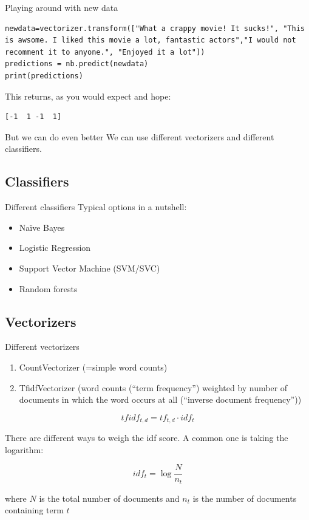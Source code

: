 \documentclass[compress]{beamer}
\begin{document}
\begin{frame}[fragile]{Playing around with new data}
\begin{lstlisting}
newdata=vectorizer.transform(["What a crappy movie! It sucks!", "This is awsome. I liked this movie a lot, fantastic actors","I would not recomment it to anyone.", "Enjoyed it a lot"])
predictions = nb.predict(newdata)
print(predictions)
\end{lstlisting}
This returns, as you would expect and hope:
\begin{lstlisting} 
[-1  1 -1  1]
\end{lstlisting}


\end{frame}




\begin{frame}{But we can do even better}
	We can use different vectorizers and different classifiers.
\end{frame}


\subsection{Classifiers}


\begin{frame}{Different classifiers}
	Typical options in a nutshell:
	\begin{itemize}
		\item Na\"ive Bayes
		\item Logistic Regression
		\item Support Vector Machine (SVM/SVC)
		\item Random forests
	\end{itemize}
\end{frame}


\subsection{Vectorizers}

\begin{frame}{Different vectorizers}
	\begin{enumerate}[<+->]
		\item CountVectorizer (=simple word counts)
		\item TfidfVectorizer (word counts (``term frequency'') weighted by number of documents in which the word occurs at all (``inverse document frequency''))
	\end{enumerate}
	
	\pause
	$$tfidf_{t,d} = tf_{t,d} \cdot idf_{t}$$
	
	There are different ways to weigh the idf score. A common one is taking the logarithm:
	
	$$idf_{t} = \log \frac{N}{n_t}$$
	
	where $N$ is the total number of documents and $n_t$ is the number of documents containing term $t$
\end{frame}
\end{document}
